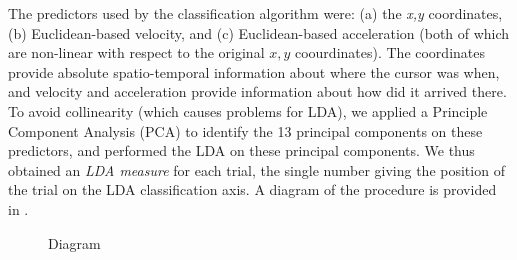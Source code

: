 \documentclass{article}
\begin{document}
The predictors used by the classification algorithm were: (a) the \textit{x,y} coordinates, (b) Euclidean-based velocity, and (c) Euclidean-based acceleration (both of which are non-linear with respect to the original $x,y$ coourdinates). The coordinates provide absolute spatio-temporal information about where the cursor was when, and velocity and acceleration provide information about how did it arrived there.
To avoid collinearity (which causes problems for LDA), we applied a Principle Component Analysis (PCA) to identify the 13 principal components on these predictors, and performed the LDA on these principal components. 
We thus obtained an \emph{LDA measure} for each trial, the single number giving the position of the trial on the LDA classification  axis.
A diagram of the procedure is provided in .

\begin{figure}

\caption{Diagram}\label{fig:diagram}
\end{figure}
\end{document}
